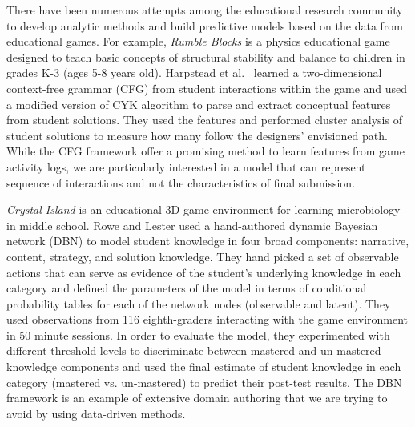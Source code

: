 \documentclass{sigchi}
\begin{document}
	There have been numerous attempts among the educational research community to develop analytic methods and build predictive models based on the data from educational games. 
	For example, \textit {Rumble Blocks} \cite{christel2012rumbleblocks} is a physics educational game designed to teach basic concepts of structural stability and balance to children in grades K-3 (ages 5-8 years old). 
	Harpstead et al.~\cite{harpstead2013investigating} learned a two-dimensional context-free grammar (CFG) from student interactions within the game and used a modified version of CYK algorithm to parse and extract conceptual features from student solutions.
	They used the features and performed cluster analysis of student solutions to measure how many follow the designers' envisioned path. 
	While the CFG framework offer a promising method to learn features from game activity logs, we are particularly interested in a model that can represent sequence of interactions and not the characteristics of final submission. 
	
	\textit{Crystal Island} \cite{rowe2010integrating} is an educational 3D game environment for learning microbiology in middle school. 
	Rowe and Lester \cite{rowe2010modeling} used a hand-authored dynamic Bayesian network (DBN) to model student knowledge in four broad components: narrative, content, strategy, and solution knowledge. 
	They hand picked a set of observable actions that can serve as evidence of the student's underlying knowledge in each category and defined the parameters of the model in terms of conditional probability tables for each of the network nodes (observable and latent).
	They used observations from 116 eighth-graders interacting with the game environment in 50 minute sessions.
	In order to evaluate the model, they experimented with different threshold levels to discriminate between mastered and un-mastered knowledge components and used the final estimate of student knowledge in each category (mastered vs. un-mastered) to predict their post-test results.
	The DBN framework is an example of extensive domain authoring that we are trying to avoid by using data-driven methods.
	
\end{document}
